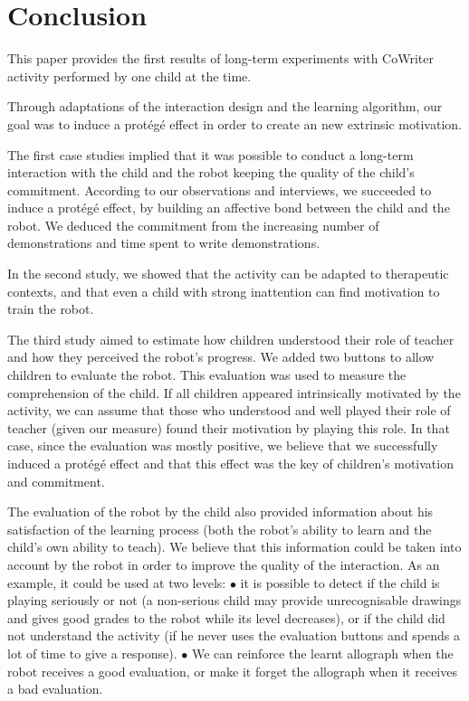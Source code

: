 \documentclass[conference]{IEEEtran}
\begin{document}
\section{Conclusion}
This paper provides the first results of long-term experiments 
with CoWriter activity performed by one child at the time.

Through adaptations of
the interaction design and the learning algorithm, our goal was to induce a prot\'eg\'e effect in order to create an new extrinsic motivation.

The first case studies implied that it was possible to conduct a long-term interaction with the child and the robot keeping the quality of the child's commitment. According to our observations and interviews, we succeeded to induce a prot\'eg\'e effect, by building an affective bond between the child and the robot. We deduced the commitment from the increasing number of demonstrations and time spent to write demonstrations.

In the second study, we showed that the activity can be adapted to therapeutic contexts, and that even a child with strong inattention can find motivation to train the robot. 

The third study aimed to estimate how children understood their role of teacher and how they perceived the robot's progress. We added two buttons to allow children to evaluate the robot. This evaluation was used to measure the comprehension of the child. If all children appeared intrinsically motivated by the activity, we can assume that those who understood and well played their role of teacher (given our measure) found their motivation by playing this role. In that case, since the evaluation was mostly positive, we believe that we successfully induced a prot\'eg\'e effect and that this effect was the key of children's motivation and commitment. 


The evaluation of the robot by the child also provided information about his satisfaction of the
learning process (both the robot's ability to learn and the child's own
ability to teach). We believe that this information could be taken into account by
the robot in order to improve the quality of the interaction. As an example, it
could be used at two levels: $\bullet$ it is possible to detect if the child is playing
seriously or not (a non-serious child may provide unrecognisable drawings and gives good grades to
the robot while its level decreases), or if the child did not understand the
activity (if he never uses the evaluation buttons and spends a lot of time to
give a response). $\bullet$ We can reinforce the learnt allograph when the robot
receives a good evaluation, or make it forget the allograph when it
receives a bad evaluation.
\end{document}
